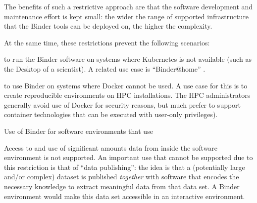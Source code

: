 \begin{workpackage}
\begin{wpdescription}
The benefits of such a restrictive approach are that the software development
and maintenance effort is kept small: the wider the range of supported
infrastructure that the Binder tools can be deployed on, the higher the
complexity.

At the same time, these restrictions prevent the following scenarios:
\begin{compactitem}
\item to run the Binder software on systems where Kubernetes is not available (such as
  the Desktop of a scientist). A related use case is ``Binder@home''
  .
\item to use Binder on systems where Docker cannot be used. A use case for this
  is to create reproducible environments on HPC installations. The HPC
  administrators generally avoid use of Docker for security reasons, but much
  prefer to support container technologies that can be executed with
  user-only privileges). 
\item Use of Binder for software environments that use 
\item Access to and use of significant amounts data from inside the software
  environment is not supported. An important use that cannot be supported due to
  this restriction is that of ``data publishing'': the idea is that a
  (potentially large and/or complex) dataset is published \emph{together} with
  software that encodes the necessary knowledge to extract meaningful data from
  that data set. A Binder environment would make this data set accessible in an
  interactive environment. 
 \end{compactitem}


\end{wpdescription}
\end{workpackage}
